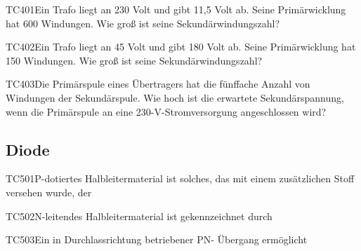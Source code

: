 \begin{question}{TC401}{Ein Trafo liegt an 230 Volt und gibt 11,5 Volt ab. Seine Primärwicklung hat 600 Windungen. Wie groß ist seine Sekundärwindungszahl?}
\end{question}

\begin{question}{TC402}{Ein Trafo liegt an 45 Volt und gibt 180 Volt ab. Seine Primärwicklung hat 150 Windungen. Wie groß ist seine Sekundärwindungszahl?}
\end{question}

\begin{question}{TC403}{Die Primärspule eines Übertragers hat die fünffache Anzahl von Windungen der Sekundärspule. Wie hoch ist die erwartete Sekundärspannung, wenn die Primärspule an eine 230-V-Stromversorgung angeschlossen wird?}
\end{question}

\subsection{Diode}

\begin{question}{TC501}{P-dotiertes Halbleitermaterial ist solches, das mit einem zusätzlichen Stoff versehen wurde, der}
\end{question}

\begin{question}{TC502}{N-leitendes Halbleitermaterial ist gekennzeichnet durch}
\end{question}

\begin{question}{TC503}{Ein in Durchlassrichtung betriebener PN- Übergang ermöglicht}
\end{question}

